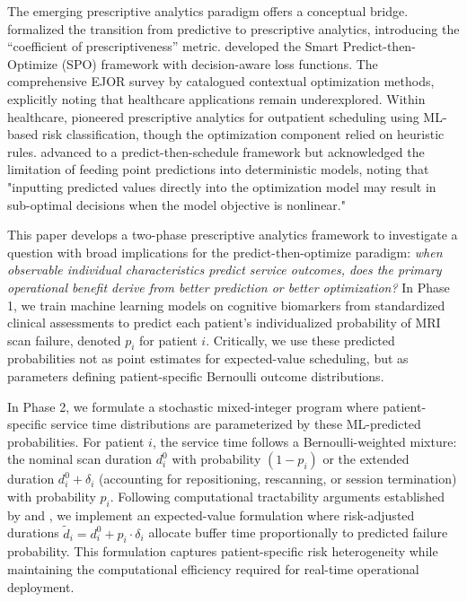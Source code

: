 \documentclass[11pt,a4paper]{article}
\begin{document}
The emerging prescriptive analytics paradigm offers a conceptual bridge. \citet{bertsimas2020predictive} formalized the transition from predictive to prescriptive analytics, introducing the ``coefficient of prescriptiveness'' metric. \citet{elmachtoub2022smart} developed the Smart Predict-then-Optimize (SPO) framework with decision-aware loss functions. The comprehensive EJOR survey by \citet{sadana2025contextual} catalogued contextual optimization methods, explicitly noting that healthcare applications remain underexplored. Within healthcare, \citet{srinivas2018prescriptive} pioneered prescriptive analytics for outpatient scheduling using ML-based risk classification, though the optimization component relied on heuristic rules. \citet{salah2022predict} advanced to a predict-then-schedule framework but acknowledged the limitation of feeding point predictions into deterministic models, noting that "inputting predicted values directly into the optimization model may result in sub-optimal decisions when the model objective is nonlinear."

This paper develops a two-phase prescriptive analytics framework to investigate a question with broad implications for the predict-then-optimize paradigm: \textit{when observable individual characteristics predict service outcomes, does the primary operational benefit derive from better prediction or better optimization?} In Phase 1, we train machine learning models on cognitive biomarkers from standardized clinical assessments to predict each patient's individualized probability of MRI scan failure, denoted $p_i$ for patient $i$. Critically, we use these predicted probabilities not as point estimates for expected-value scheduling, but as parameters defining patient-specific Bernoulli outcome distributions.

In Phase 2, we formulate a stochastic mixed-integer program where patient-specific service time distributions are parameterized by these ML-predicted probabilities. For patient $i$, the service time follows a Bernoulli-weighted mixture: the nominal scan duration $d_i^0$ with probability $(1-p_i)$ or the extended duration $d_i^0 + \delta_i$ (accounting for repositioning, rescanning, or session termination) with probability $p_i$. Following computational tractability arguments established by \citet{denton2003sequential} and \citet{mancilla2012sample}, we implement an expected-value formulation where risk-adjusted durations $\tilde{d}_i = d_i^0 + p_i \cdot \delta_i$ allocate buffer time proportionally to predicted failure probability. This formulation captures patient-specific risk heterogeneity while maintaining the computational efficiency required for real-time operational deployment.
\end{document}
